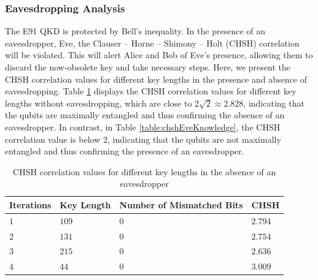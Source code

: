 \documentclass[a4paper]{cas-sc}
\begin{document}
\subsubsection{Eavesdropping Analysis}
The E91 QKD is protected by Bell's inequality. In the presence of an eavesdropper, Eve, the Clauser -- Horne -- Shimony -- Holt (CHSH) correlation \cite{PhysRevLett.23.880} will be violated. This will alert Alice and Bob of Eve's presence, allowing them to discard the now-obsolete key and take necessary steps. Here, we present the CHSH correlation values for different key lengths in the presence and absence of eavesdropping. Table \ref{table:chsheRsults} displays the CHSH correlation values for different key lengths without eavesdropping, which are close to $2\sqrt{2} \approx 2.828$, indicating that the qubits are maximally entangled and thus confirming the absence of an eavesdropper. In contrast, in Table \ref{table:chshEveKnowledge}, the CHSH correlation value is below 2, indicating that the qubits are not maximally entangled and thus confirming the presence of an eavesdropper.
\begin{table}[pos=h]
    \begin{center}
        \caption{CHSH correlation values for different key lengths in the absence of an eavesdropper}
        \begin{tabularx}{\textwidth}{>{\centering\arraybackslash}X>{\centering\arraybackslash}X>{\centering\arraybackslash}X>{\centering\arraybackslash}X}
            \hline
            Iterations & Key Length & Number of Mismatched Bits & CHSH    \\ \hline
            $1$        & $109$      & $0$                       & $2.794$ \\
            $2$        & $131$      & $0$                       & $2.754$ \\
            $3$        & $215$      & $0$                       & $2.636$ \\
            $4$        & $44$       & $0$                       & $3.009$ \\
            \hline
        \end{tabularx}
        \label{table:chsheRsults}
    \end{center}
\end{table}
\end{document}
